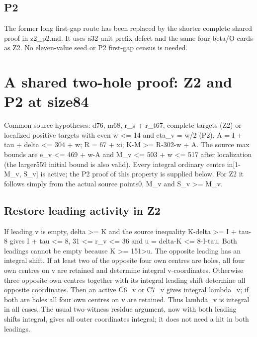\documentclass[11pt,a4paper]{article}
\begin{document}
\hypertarget{p2}{%
\subsection{P2}\label{p2}}

The former long first-gap route has been replaced by the shorter
complete shared proof in z2\_p2.md. It uses a32-unit prefix defect and
the same four beta/O cards as Z2. No eleven-value seed or P2 first-gap
census is needed.

\clearpage
\hypertarget{a-shared-two-hole-proof-z2-and-p2-at-size84}{%
\section{A shared two-hole proof: Z2 and P2 at
size84}\label{a-shared-two-hole-proof-z2-and-p2-at-size84}}

Common source hypotheses: d76, m68, r\_s + r\_t67, complete targets (Z2)
or localized positive targets with even w \textless= 14 and eta\_v = w/2
(P2). A = I + tau + delta \textless= 304 + w; R = 67 + xi; K-M
\textgreater= R-302-w + A. The source max bounds are e\_v \textless= 469
+ w-A and M\_v \textless= 503 + w \textless= 517 after localization (the
larger559 initial bound is also valid). Every integral ordinary centre
in{[}1-M\_v, S\_v{]} is active; the P2 proof of this property is
supplied below. For Z2 it follows simply from the actual source points0,
M\_v and S\_v \textgreater= M\_v.

\hypertarget{restore-leading-activity-in-z2}{%
\subsection{Restore leading activity in
Z2}\label{restore-leading-activity-in-z2}}

If leading v is empty, delta \textgreater= K and the source inequality
K-delta \textgreater= I + tau-8 gives I + tau \textless= 8, 31
\textless= r\_v \textless= 36 and u = delta-K \textless= 8-I-tau. Both
leadings cannot be empty because K \textgreater= 151\textgreater u. The
opposite leading has an integral shift. If at least two of the opposite
four own centres are holes, all four own centres on v are retained and
determine integral v-coordinates. Otherwise three opposite own centres
together with its integral leading shift determine all opposite
coordinates. Then an active C6\_v or C7\_v gives integral lambda\_v; if
both are holes all four own centres on v are retained. Thus lambda\_v is
integral in all cases. The usual two-witness residue argument, now with
both leading shifts integral, gives all outer coordinates integral; it
does not need a hit in both leadings.
\end{document}
